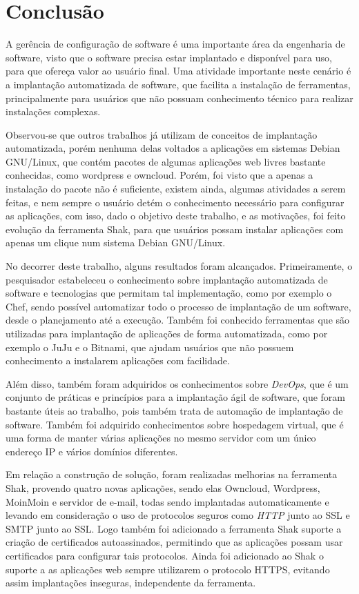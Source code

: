 \chapter{Conclusão}
\label{cap-conclusoes}

A gerência de configuração de software é uma importante área da engenharia de software,
visto que o software precisa estar implantado e disponível para uso, para que ofereça
valor ao usuário final. Uma atividade importante neste cenário é a implantação
automatizada de software, que facilita a instalação de ferramentas, principalmente
para usuários que não possuam conhecimento técnico para realizar instalações complexas.

Observou-se que outros trabalhos já utilizam de conceitos de implantação automatizada,
porém nenhuma delas voltados a aplicações em sistemas Debian GNU/Linux, que contém
pacotes de algumas aplicações web livres bastante conhecidas, como wordpress e
owncloud. Porém, foi visto que a apenas a instalação do pacote não é suficiente,
existem ainda, algumas atividades a serem feitas, e nem sempre o usuário detém
o conhecimento necessário para configurar as aplicações, com isso, dado o objetivo
deste trabalho, e as motivações, foi feito evolução da ferramenta Shak, para
que usuários possam instalar aplicações com apenas um clique num sistema Debian
GNU/Linux.

No decorrer deste trabalho, alguns resultados foram alcançados. Primeiramente, o
pesquisador estabeleceu o conhecimento sobre implantação automatizada
de software e tecnologias que permitam tal implementação, como por exemplo o Chef,
sendo possível automatizar todo o processo de implantação de um software,
desde o planejamento até a execução. Também foi conhecido ferramentas que são
utilizadas para implantação de aplicações de forma automatizada, como por exemplo
o JuJu e o Bitnami, que ajudam usuários que não possuem conhecimento a
instalarem aplicações com facilidade.

Além disso, também foram adquiridos os conhecimentos sobre \textit{DevOps}, que é um conjunto
de práticas e princípios para a implantação ágil de software, que foram bastante
úteis ao trabalho, pois também trata de automação de implantação de software. Também
foi adquirido conhecimentos sobre hospedagem virtual, que é uma forma de manter
várias aplicações no mesmo servidor com um único endereço IP e vários domínios diferentes.

Em relação a construção de solução, foram realizadas melhorias na ferramenta Shak,
provendo quatro novas aplicações, sendo elas Owncloud, Wordpress, MoinMoin e
servidor de e-mail, todas sendo implantadas automaticamente e
levando em consideração o uso de protocolos seguros como \textit{HTTP} junto ao SSL e SMTP
junto ao SSL. Logo também foi adicionado a
ferramenta Shak suporte a criação de certificados autoassinados, permitindo que
as aplicações possam usar certificados para configurar tais protocolos. Ainda foi
adicionado ao Shak o suporte a as aplicações web sempre utilizarem
o protocolo HTTPS, evitando assim implantações inseguras, independente da ferramenta.

